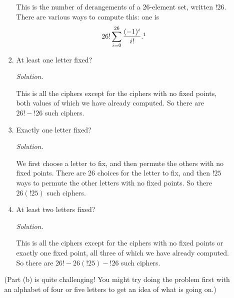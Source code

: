 \documentclass[12pt]{amsart}
\theoremstyle{definition}
\begin{document}
\begin{enumerate}
\begin{enumerate}
\begin{enumerate}
				This is the number of derangements of a 26-element set, written $!26$. There are various ways to compute this: one is $$26! \sum_{i=0}^{26} \frac{(-1)^i}{i!}.\footnote{See the proof of this \href{https://en.wikipedia.org/wiki/Derangement}{here.}}$$ 
				\item At least one letter fixed?
				
				\medskip
				\textit{Solution.}

				This is all the ciphers except for the ciphers with no fixed points, both values of which we have already computed. So there are $26! - !26$ such ciphers.

				\item Exactly one letter fixed?
				
				\medskip
				\textit{Solution.}
			
				We first choose a letter to fix, and then permute the others with no fixed points. There are 26 choices for the letter to fix, and then $!25$ ways to permute the other letters with no fixed points. So there $26(!25)$ such ciphers.

				\item At least two letters fixed?
				
				\medskip
				\textit{Solution.}

				This is all the ciphers except for the ciphers with no fixed points or exactly one fixed point, all three of which we have already computed. So there are $26! - 26(!25) - !26$ such ciphers. 
			\end{enumerate}
			(Part (b) is quite challenging! You might try doing the problem first with an alphabet 
			of four or five letters to get an idea of what is going on.)
		\end{enumerate}

	\end{enumerate}
\end{document}
